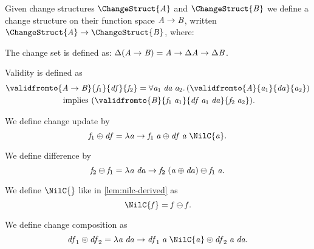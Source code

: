 \begin{definition}
  \label{def:chs-fun}
  Given change structures \ensuremath{\ChangeStruct{\Conid{A}}} and \ensuremath{\ChangeStruct{\Conid{B}}} we define a change structure on
  their function space \ensuremath{\Conid{A}\to \Conid{B}}, written \ensuremath{\ChangeStruct{\Conid{A}}\to \ChangeStruct{\Conid{B}}}, where:
  \begin{subdefinition}
  \item The change set is defined as: \ensuremath{\Delta (\Conid{A}\to \Conid{B})\mathrel{=}\Conid{A}\to \Delta \Conid{A}\to \Delta \Conid{B}}.
  \item Validity is defined as
    \begin{multline*}
      \ensuremath{\validfromto{\Conid{A}\to \Conid{B}}{\Varid{f}_{1}}{\Varid{df}}{\Varid{f}_{2}}\mathrel{=}\forall \Varid{a}_{1}\hsforall \;\Varid{da}\;\Varid{a}_{2}\hsdot{\circ }{\mathpunct{.}}(\validfromto{\Conid{A}}{\Varid{a}_{1}}{\Varid{da}}{\Varid{a}_{2}})} \\
      \text{ implies } \ensuremath{(\validfromto{\Conid{B}}{\Varid{f}_{1}\;\Varid{a}_{1}}{\Varid{df}\;\Varid{a}_{1}\;\Varid{da}}{\Varid{f}_{2}\;\Varid{a}_{2}})}.
    \end{multline*}
  \item We define change update by
    \[\ensuremath{\Varid{f}_{1}\oplus \Varid{df}\mathrel{=}\lambda \Varid{a}\to \Varid{f}_{1}\;\Varid{a}\oplus \Varid{df}\;\Varid{a}\;\NilC{\Varid{a}}}.\]
  \item We define difference by \[\mathit{f}_{2}\ominus \mathit{f}_{1}\mathrel{=}\lambda \mathit{a}\;\mathit{da}\to \mathit{f}_{2}\;(\mathit{a}\oplus \mathit{da})\ominus \mathit{f}_{1}\;\mathit{a}.\]
  \item We define \ensuremath{\NilC{}} like in \cref{lem:nilc-derived} as \[\ensuremath{\NilC{\Varid{f}}\mathrel{=}\Varid{f}\ominus \Varid{f}}.\]
  \item We define change composition as \[\ensuremath{\Varid{df}_{1}\circledcirc\Varid{df}_{2}\mathrel{=}\lambda \Varid{a}\;\Varid{da}\to \Varid{df}_{1}\;\Varid{a}\;\NilC{\Varid{a}}\circledcirc\Varid{df}_{2}\;\Varid{a}\;\Varid{da}}.\]
  \end{subdefinition}
\end{definition}

